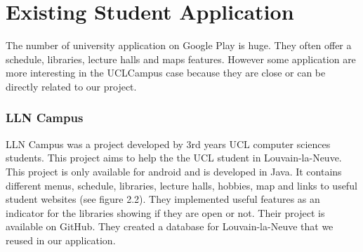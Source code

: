 \documentclass[11pt, a4paper]{report}
\begin{document}
\section{Existing Student Application}

The number of university application on Google Play is huge. They often offer a schedule, libraries, lecture halls and maps features. However some application are more interesting in the UCLCampus case because they are close or can be directly related to our project.  

\subsubsection{LLN Campus}
LLN Campus was a project developed by 3rd years UCL computer sciences students. This project aims to help the the UCL student in Louvain-la-Neuve. This project is only available for android and is developed in Java. It contains different menus, schedule, libraries, lecture halls, hobbies, map and links to useful student websites (see figure 2.2). They implemented useful features as an indicator for the libraries showing if they are open or not. Their project is available on GitHub. They created a database for Louvain-la-Neuve that we reused in our application. 
\end{document}
